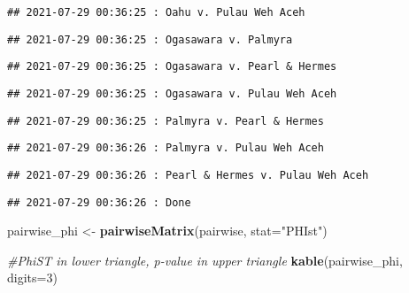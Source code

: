 \documentclass[
]{article}
\newenvironment{Shaded}{\begin{snugshade}}{\end{snugshade}}
\newcommand{\CommentTok}[1]{\textcolor[rgb]{0.56,0.35,0.01}{\textit{#1}}}
\newcommand{\DataTypeTok}[1]{\textcolor[rgb]{0.13,0.29,0.53}{#1}}
\newcommand{\DecValTok}[1]{\textcolor[rgb]{0.00,0.00,0.81}{#1}}
\newcommand{\KeywordTok}[1]{\textcolor[rgb]{0.13,0.29,0.53}{\textbf{#1}}}
\newcommand{\NormalTok}[1]{#1}
\newcommand{\StringTok}[1]{\textcolor[rgb]{0.31,0.60,0.02}{#1}}
\begin{document}
\begin{verbatim}
## 2021-07-29 00:36:25 : Oahu v. Pulau Weh Aceh
\end{verbatim}

\begin{verbatim}
## 2021-07-29 00:36:25 : Ogasawara v. Palmyra
\end{verbatim}

\begin{verbatim}
## 2021-07-29 00:36:25 : Ogasawara v. Pearl & Hermes
\end{verbatim}

\begin{verbatim}
## 2021-07-29 00:36:25 : Ogasawara v. Pulau Weh Aceh
\end{verbatim}

\begin{verbatim}
## 2021-07-29 00:36:25 : Palmyra v. Pearl & Hermes
\end{verbatim}

\begin{verbatim}
## 2021-07-29 00:36:26 : Palmyra v. Pulau Weh Aceh
\end{verbatim}

\begin{verbatim}
## 2021-07-29 00:36:26 : Pearl & Hermes v. Pulau Weh Aceh
\end{verbatim}

\begin{verbatim}
## 2021-07-29 00:36:26 : Done
\end{verbatim}

\begin{Shaded}
\begin{Highlighting}[]
\NormalTok{pairwise_phi <-}\StringTok{ }\KeywordTok{pairwiseMatrix}\NormalTok{(pairwise, }\DataTypeTok{stat=}\StringTok{"PHIst"}\NormalTok{)}

\CommentTok{#PhiST in lower triangle, p-value in upper triangle}
\KeywordTok{kable}\NormalTok{(pairwise_phi, }\DataTypeTok{digits=}\DecValTok{3}\NormalTok{)}
\end{Highlighting}
\end{Shaded}
\end{document}
